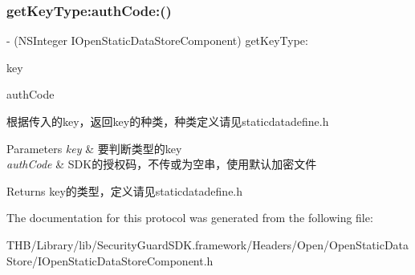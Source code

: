 \subsubsection{\texorpdfstring{get\+Key\+Type\+:auth\+Code\+:()}{getKeyType:authCode:()}}
{\footnotesize\ttfamily -\/ (N\+S\+Integer I\+Open\+Static\+Data\+Store\+Component) get\+Key\+Type\+: \begin{DoxyParamCaption}\item[{(N\+S\+String $\ast$)}]{key }\item[{authCode:(N\+S\+String $\ast$)}]{auth\+Code }\end{DoxyParamCaption}}

根据传入的key，返回key的种类，种类定义请见staticdatadefine.\+h


\begin{DoxyParams}{Parameters}
{\em key} & 要判断类型的key\\
\hline
{\em auth\+Code} & S\+D\+K的授权码，不传或为空串，使用默认加密文件\\
\hline
\end{DoxyParams}
\begin{DoxyReturn}{Returns}
key的类型，定义请见staticdatadefine.\+h 
\end{DoxyReturn}


The documentation for this protocol was generated from the following file\+:\begin{DoxyCompactItemize}
\item 
T\+H\+B/\+Library/lib/\+Security\+Guard\+S\+D\+K.\+framework/\+Headers/\+Open/\+Open\+Static\+Data\+Store/I\+Open\+Static\+Data\+Store\+Component.\+h\end{DoxyCompactItemize}
